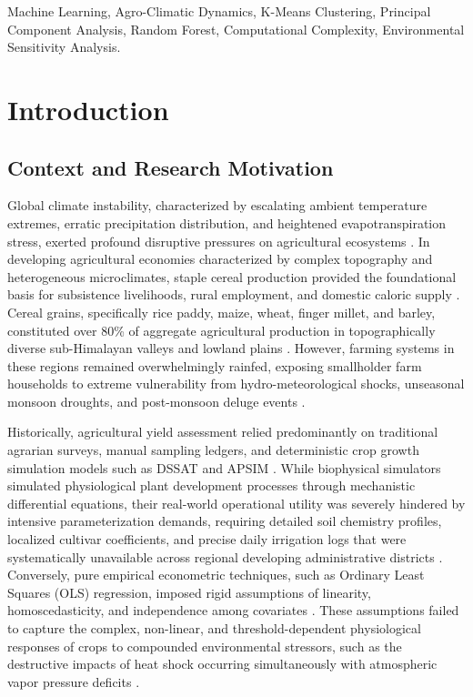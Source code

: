 \documentclass[conference]{IEEEtran}
\begin{document}
\begin{IEEEkeywords}
Machine Learning, Agro-Climatic Dynamics, K-Means Clustering, Principal Component Analysis, Random Forest, Computational Complexity, Environmental Sensitivity Analysis.
\end{IEEEkeywords}

\section{Introduction}

\subsection{Context and Research Motivation}
Global climate instability, characterized by escalating ambient temperature extremes, erratic precipitation distribution, and heightened evapotranspiration stress, exerted profound disruptive pressures on agricultural ecosystems \cite{dhakal2023, crane2018, lobell2008}. In developing agricultural economies characterized by complex topography and heterogeneous microclimates, staple cereal production provided the foundational basis for subsistence livelihoods, rural employment, and domestic caloric supply \cite{dhakal2023, fernandez2021}. Cereal grains, specifically rice paddy, maize, wheat, finger millet, and barley, constituted over 80\% of aggregate agricultural production in topographically diverse sub-Himalayan valleys and lowland plains \cite{dhakal2023}. However, farming systems in these regions remained overwhelmingly rainfed, exposing smallholder farm households to extreme vulnerability from hydro-meteorological shocks, unseasonal monsoon droughts, and post-monsoon deluge events \cite{fernandez2021, lobell2008}.

Historically, agricultural yield assessment relied predominantly on traditional agrarian surveys, manual sampling ledgers, and deterministic crop growth simulation models such as DSSAT and APSIM \cite{crane2018}. While biophysical simulators simulated physiological plant development processes through mechanistic differential equations, their real-world operational utility was severely hindered by intensive parameterization demands, requiring detailed soil chemistry profiles, localized cultivar coefficients, and precise daily irrigation logs that were systematically unavailable across regional developing administrative districts \cite{crane2018, fernandez2021}. Conversely, pure empirical econometric techniques, such as Ordinary Least Squares (OLS) regression, imposed rigid assumptions of linearity, homoscedasticity, and independence among covariates \cite{hastie2009, hoerl1970}. These assumptions failed to capture the complex, non-linear, and threshold-dependent physiological responses of crops to compounded environmental stressors, such as the destructive impacts of heat shock occurring simultaneously with atmospheric vapor pressure deficits \cite{schlenker2009, demartonne1926}.
\end{document}
